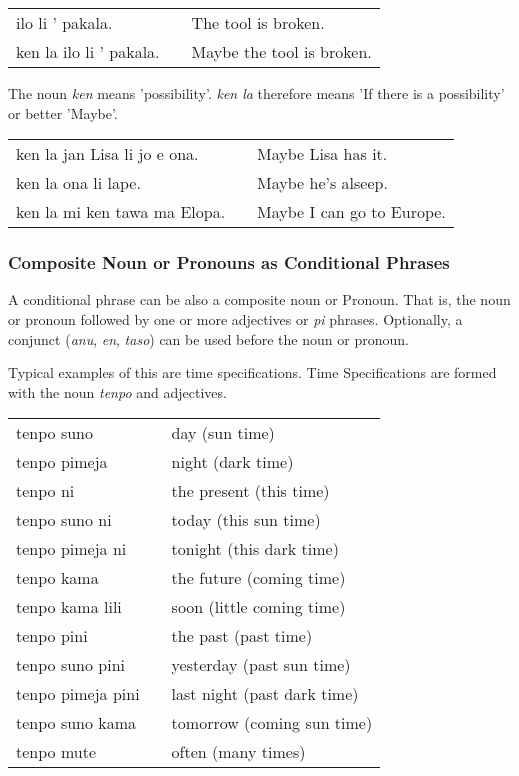 \begin{supertabular}{p{5,5cm}|ll}
ilo li ' pakala. && The tool is broken. \\
ken la ilo li ' pakala. && Maybe the tool is broken. \\
\end{supertabular} 

The noun \textit{ken} means 'possibility'.
\textit{ken la} therefore means 'If there is a possibility' or better 'Maybe'.
 
\begin{supertabular}{p{5,5cm}|ll}
ken la jan Lisa li jo e ona. && Maybe Lisa has it. \\
ken la ona li lape. && Maybe he's alseep. \\
ken la mi ken tawa ma Elopa. && Maybe I can go to Europe. \\
\end{supertabular} 

%
\subsubsection*{Composite Noun or Pronouns as Conditional Phrases}
%

A conditional phrase can be also a composite noun or Pronoun. 
That is, the noun or pronoun followed by one or more adjectives or \textit{pi} phrases.
Optionally, a conjunct (\textit{anu}, \textit{en}, \textit{taso}) can be used before the noun or pronoun. 

Typical examples of this are time specifications. 
Time Specifications are formed with the noun \textit{tenpo} and adjectives. 

\begin{supertabular}{p{5,5cm}|ll}
tenpo suno && day (sun time) \\
tenpo pimeja && night (dark time) \\
tenpo ni && the present (this time) \\
tenpo suno ni && today (this sun time) \\
tenpo pimeja ni && tonight (this dark time) \\
tenpo kama && the future (coming time) \\
tenpo kama lili && soon (little coming time) \\
tenpo pini && the past (past time) \\
tenpo suno pini && yesterday (past sun time) \\
tenpo pimeja pini && last night (past dark time) \\
tenpo suno kama && tomorrow (coming sun time) \\
tenpo mute && often (many times) \\
\end{supertabular} 

